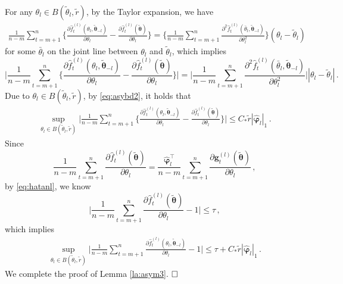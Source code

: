 \documentclass[12pt]{article}
\newcommand{\btheta}{\boldsymbol \theta}
\newcommand{\bvarphi}{\boldsymbol \varphi}
\def\T{{\scriptscriptstyle \top} }
\newcommand{\bg}{{\mathbf g}}
\newcommand{\0}{{\bf 0}}
\begin{document}
For any $\theta_l\in B(\tilde{\theta}_l,\tilde{r})$, by the Taylor expansion, we have
\begin{align*}
\frac{1}{n-m}\sum_{t=m+1}^n\bigg\{\frac{\partial\hat{f}_t^{(l)}(\theta_l,\tilde{\btheta}_{-l})}{\partial\theta_l}-\frac{\partial \hat{f}_t^{(l)}(\tilde{\btheta})}{\partial\theta_l}\bigg\}=\bigg\{\frac{1}{n-m}\sum_{t=m+1}^n\frac{\partial^2\hat{f}_t^{(l)}(\bar{\theta}_l,\tilde{\btheta}_{-l})}{\partial\theta_l^2}\bigg\}(\theta_l-\tilde{\theta}_l)
\end{align*}
for some $\bar{\theta}_l$ on the joint line between $\theta_l$ and $\tilde{\theta}_l$, which implies
\[
\bigg|\frac{1}{n-m}\sum_{t=m+1}^n\bigg\{\frac{\partial\hat{f}_t^{(l)}(\theta_l,\tilde{\btheta}_{-l})}{\partial\theta_l}-\frac{\partial \hat{f}_t^{(l)}(\tilde{\btheta})}{\partial\theta_l}\bigg\}\bigg|=\bigg|\frac{1}{n-m}\sum_{t=m+1}^n\frac{\partial^2\hat{f}_t^{(l)}(\bar{\theta}_l,\tilde{\btheta}_{-l})}{\partial\theta_l^2}\bigg||\theta_l-\tilde{\theta}_l|\,.
\]
Due to $\theta_l\in B(\tilde{\theta}_l,\tilde{r})$, by \eqref{eq:asybd2}, it holds that
\begin{align*}
\sup_{\theta_l\in B(\tilde{\theta}_l,\tilde{r})}\bigg|\frac{1}{n-m}\sum_{t=m+1}^n\bigg\{\frac{\partial\hat{f}_t^{(l)}(\theta_l,\tilde{\btheta}_{-l})}{\partial\theta_l}-\frac{\partial \hat{f}_t^{(l)}(\tilde{\btheta})}{\partial\theta_l}\bigg\}\bigg|\leq C_*\tilde{r}|\hat{\bvarphi}_l|_1\,.
\end{align*}
Since
\[
\frac{1}{n-m}\sum_{t=m+1}^n\frac{\partial\hat{f}_t^{(l)}(\tilde{\btheta})}{\partial\theta_l}=\frac{\hat{\bvarphi}_l^{\T}}{n-m}\sum_{t=m+1}^n\frac{\partial \bg_t^{(l)}(\tilde{\btheta})}{\partial\theta_l}\,,
\]
by \eqref{eq:hatanl}, we know
\[
\bigg|\frac{1}{n-m}\sum_{t=m+1}^n\frac{\partial\hat{f}_t^{(l)}(\tilde{\btheta})}{\partial\theta_l}-1\bigg|\leq \tau\,,
\]
which implies
\begin{align*}
\sup_{\theta_l\in B(\tilde{\theta}_l,\tilde{r})}\bigg|\frac{1}{n-m}\sum_{t=m+1}^n\frac{\partial\hat{f}_t^{(l)}(\theta_l,\tilde{\btheta}_{-l})}{\partial\theta_l}-1\bigg|\leq \tau+C_*\tilde{r}|\hat{\bvarphi}_l|_1\,.
\end{align*}
We complete the proof of Lemma \ref{la:asym3}. $\hfill\Box$ 
\end{document}
